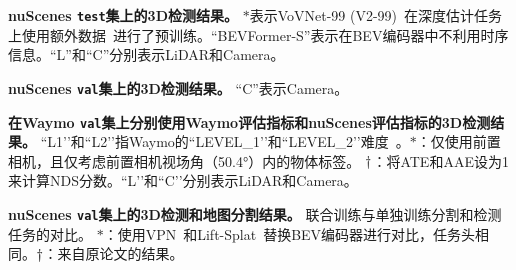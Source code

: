 \documentclass{article}
\begin{document}
\begin{table}[t]
\begin{center}
\caption{
\textbf{nuScenes \texttt{test}集上的3D检测结果。} $*$表示VoVNet-99 (V2-99)~\cite{lee2019energy}在深度估计任务上使用额外数据~\cite{park2021pseudo}进行了预训练。``BEVFormer-S''表示在BEV编码器中不利用时序信息。``L''和``C''分别表示LiDAR和Camera。
}

\setlength{\tabcolsep}{0.28mm}

\label{main_det}
\end{center}
\end{table}
\begin{table}[t]
\begin{center}
\caption{
\textbf{nuScenes \texttt{val}集上的3D检测结果。} ``C''表示Camera。
}

\setlength{\tabcolsep}{0.87mm}

\label{val_det}
\end{center}
\end{table}

\begin{table}[t] 
\begin{center}
\caption{\textbf{在Waymo \texttt{val}集上分别使用Waymo评估指标和nuScenes评估指标的3D检测结果。} ``L1’’和``L2’’指Waymo的``LEVEL\_1’’和``LEVEL\_2’’难度~\cite{sun2020scalability}。$*$：仅使用前置相机，且仅考虑前置相机视场角（50.4°）内的物体标签。
${\text{\textdagger}}$：将ATE和AAE设为1来计算NDS分数。``L’’和``C’’分别表示LiDAR和Camera。
}

\setlength{\tabcolsep}{0.5mm}

\label{table:Waymo}
\end{center}
\end{table}



\begin{table}[t] 
\begin{center}

\caption{
\textbf{nuScenes \texttt{val}集上的3D检测和地图分割结果。}
联合训练与单独训练分割和检测任务的对比。
$*$：使用VPN~\cite{pan2020cross}和Lift-Splat~\cite{philion2020lift}替换BEV编码器进行对比，任务头相同。${\text{\textdagger}}$：来自原论文的结果。
}

\setlength{\tabcolsep}{2.9mm}

\label{table:multi-tasks}
\end{center}
\end{table}
\end{document}
